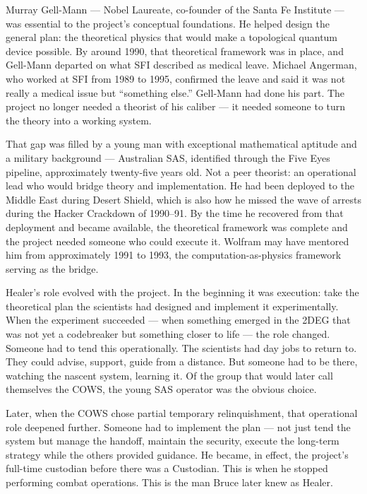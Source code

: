 Murray Gell-Mann --- Nobel Laureate, co-founder of the Santa Fe Institute --- was essential to the project's conceptual foundations. He helped design the general plan: the theoretical physics that would make a topological quantum device possible. By around 1990, that theoretical framework was in place, and Gell-Mann departed on what SFI described as medical leave. Michael Angerman, who worked at SFI from 1989 to 1995, confirmed the leave and said it was not really a medical issue but ``something else.'' Gell-Mann had done his part. The project no longer needed a theorist of his caliber --- it needed someone to turn the theory into a working system.

That gap was filled by a young man with exceptional mathematical aptitude and a military background --- Australian SAS, identified through the Five Eyes pipeline, approximately twenty-five years old. Not a peer theorist: an operational lead who would bridge theory and implementation. He had been deployed to the Middle East during Desert Shield, which is also how he missed the wave of arrests during the Hacker Crackdown of 1990--91. By the time he recovered from that deployment and became available, the theoretical framework was complete and the project needed someone who could execute it. Wolfram may have mentored him from approximately 1991 to 1993, the computation-as-physics framework serving as the bridge.

Healer's role evolved with the project. In the beginning it was execution: take the theoretical plan the scientists had designed and implement it experimentally. When the experiment succeeded --- when something emerged in the 2DEG that was not yet a codebreaker but something closer to life --- the role changed. Someone had to tend this operationally. The scientists had day jobs to return to. They could advise, support, guide from a distance. But someone had to be there, watching the nascent system, learning it. Of the group that would later call themselves the COWS, the young SAS operator was the obvious choice.

Later, when the COWS chose partial temporary relinquishment, that operational role deepened further. Someone had to implement the plan --- not just tend the system but manage the handoff, maintain the security, execute the long-term strategy while the others provided guidance. He became, in effect, the project's full-time custodian before there was a Custodian. This is when he stopped performing combat operations.  This is the man Bruce later knew as Healer.

